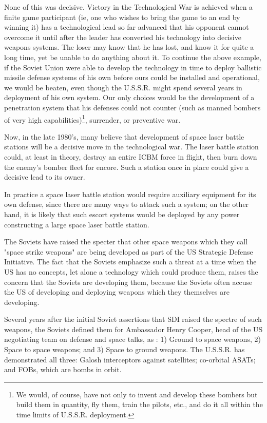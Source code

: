 None of this was decisive. Victory in the Technological War is achieved when a finite game participant (ie, one who wishes to bring the game to an end by winning it) has a technological lead so far advanced that his opponent cannot overcome it until after the leader has converted his technology into decisive weapons systems. The loser may know that he has lost, and know it for quite a long time, yet be unable to do anything about it. To continue the above example, if the Soviet Union were able to develop the technology in time to deploy ballistic missile defense systems of his own before ours could be installed and operational, we would be beaten, even though the U.S.S.R. might spend several years in deployment of his own system. Our only choices would be the development of a penetration system that his defenses could not counter (such as manned bombers of very high capabilities)\footnote{We would, of course, have not only to invent and develop these bombers but build them in quantity, fly them, train the pilots, etc., and do it all within the time limits of U.S.S.R. deployment.}, surrender, or preventive war.

Now, in the late 1980's, many believe that development of space laser battle stations will be a decisive move in the technological war. The laser battle station could, at least in theory, destroy an entire ICBM force in flight, then burn down the enemy's bomber fleet for encore. Such a station once in place could give a decisive lead to its owner.

In practice a space laser battle station would require auxiliary equipment for its own defense, since there are many ways to attack such a system; on the other hand, it is likely that such escort systems would be deployed by any power constructing a large space laser battle station.

The Soviets have raised the specter that other space weapons which they call "space strike weapons" are being developed as part of the US Strategic Defense Initiative. The fact that the Soviets emphasize such a threat at a time when the US has no concepts, let alone a technology which could produce them, raises the concern that the Soviets are developing them, because the Soviets often accuse the US of developing and deploying weapons which they themselves are developing.

Several years after the initial Soviet assertions that SDI raised the spectre of such weapons, the Soviets defined them for Ambassador Henry Cooper, head of the US negotiating team on defense and space talks, as : 1) Ground to space weapons, 2) Space to space weapons; and 3) Space to ground weapons. The U.S.S.R. has demonstrated all three: Galosh interceptors against satellites; co-orbital ASATs; and FOBs, which are bombs in orbit.

